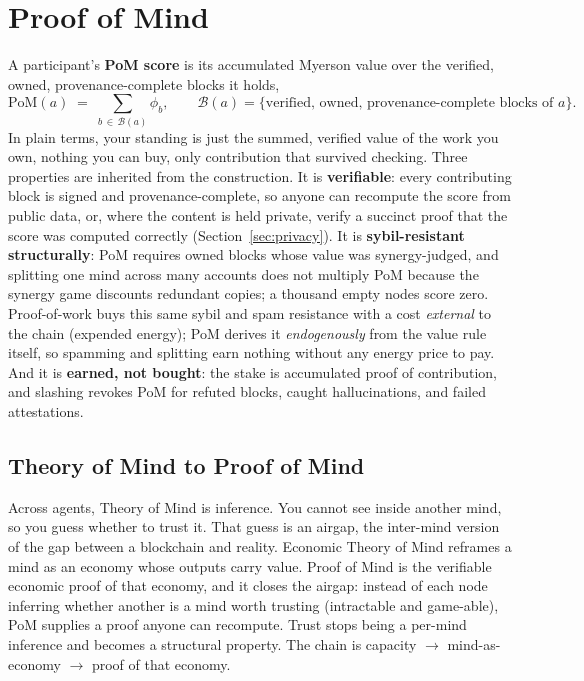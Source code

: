 \documentclass[10pt]{article}
\begin{document}
\section{Proof of Mind}

A participant's \textbf{PoM score} is its accumulated Myerson value over the verified, owned,
provenance-complete blocks it holds,
\begin{equation}
\mathrm{PoM}(a) \;=\; \sum_{b\,\in\,\mathcal{B}(a)} \phi_b ,
\qquad \mathcal{B}(a) = \{\text{verified, owned, provenance-complete blocks of } a\}.
\end{equation}
In plain terms, your standing is just the summed, verified value of the work you own, nothing you can
buy, only contribution that survived checking.
Three properties are inherited from the construction. It is \textbf{verifiable}: every contributing
block is signed and provenance-complete, so anyone can recompute the score from public data, or, where
the content is held private, verify a succinct proof that the score was computed correctly
(Section~\ref{sec:privacy}). It is
\textbf{sybil-resistant structurally}: PoM requires owned blocks whose value was synergy-judged, and
splitting one mind across many accounts does not multiply PoM because the synergy game discounts
redundant copies; a thousand empty nodes score zero. Proof-of-work buys this same sybil and spam
resistance with a cost \emph{external} to the chain (expended energy); PoM derives it \emph{endogenously}
from the value rule itself, so spamming and splitting earn nothing without any energy price to pay. And it is \textbf{earned, not bought}: the stake
is accumulated proof of contribution, and slashing revokes PoM for refuted blocks, caught
hallucinations, and failed attestations.

\subsection{Theory of Mind to Proof of Mind}

Across agents, Theory of Mind is inference. You cannot see inside another mind, so you guess whether to
trust it. That guess is an airgap, the inter-mind version of the gap between a blockchain and reality.
Economic Theory of Mind reframes a mind as an economy whose outputs carry value. Proof of Mind is the
verifiable economic proof of that economy, and it closes the airgap: instead of each node inferring
whether another is a mind worth trusting (intractable and game-able), PoM supplies a proof anyone can
recompute. Trust stops being a per-mind inference and becomes a structural property. The chain is
capacity $\to$ mind-as-economy $\to$ proof of that economy.
\end{document}
